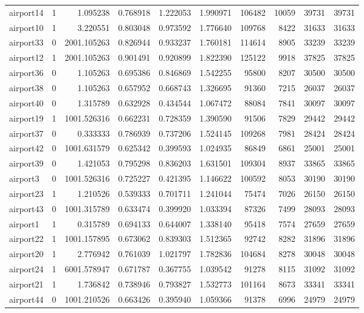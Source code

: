 \begin{longtable}{|l|r|r|r|r|r|r|r|r|r|}
airport14 & 1 & 1.095238 & 0.768918 & 1.222053 & 1.990971 & 106482 & 10059 & 39731 & 39731 \\
airport10 & 1 & 3.220551 & 0.803048 & 0.973592 & 1.776640 & 109768 & 8422 & 31633 & 31633 \\
airport33 & 0 & 2001.105263 & 0.826944 & 0.933237 & 1.760181 & 114614 & 8905 & 33239 & 33239 \\
airport12 & 1 & 2001.105263 & 0.901491 & 0.920899 & 1.822390 & 125122 & 9918 & 37825 & 37825 \\
airport36 & 0 & 1.105263 & 0.695386 & 0.846869 & 1.542255 & 95800 & 8207 & 30500 & 30500 \\
airport38 & 0 & 1.105263 & 0.657952 & 0.668743 & 1.326695 & 91360 & 7215 & 26037 & 26037 \\
airport40 & 0 & 1.315789 & 0.632928 & 0.434544 & 1.067472 & 88084 & 7841 & 30097 & 30097 \\
airport19 & 1 & 1001.526316 & 0.662231 & 0.728359 & 1.390590 & 91506 & 7829 & 29442 & 29442 \\
airport37 & 0 & 0.333333 & 0.786939 & 0.737206 & 1.524145 & 109268 & 7981 & 28424 & 28424 \\
airport42 & 0 & 1001.631579 & 0.625342 & 0.399593 & 1.024935 & 86849 & 6861 & 25001 & 25001 \\
airport39 & 0 & 1.421053 & 0.795298 & 0.836203 & 1.631501 & 109304 & 8937 & 33865 & 33865 \\
airport3 & 0 & 1001.526316 & 0.725227 & 0.421395 & 1.146622 & 100592 & 8053 & 30190 & 30190 \\
airport23 & 1 & 1.210526 & 0.539333 & 0.701711 & 1.241044 & 75474 & 7026 & 26150 & 26150 \\
airport43 & 0 & 1001.315789 & 0.633474 & 0.399920 & 1.033394 & 87326 & 7499 & 28093 & 28093 \\
airport1 & 1 & 0.315789 & 0.694133 & 0.644007 & 1.338140 & 95418 & 7574 & 27659 & 27659 \\
airport22 & 1 & 1001.157895 & 0.673062 & 0.839303 & 1.512365 & 92742 & 8282 & 31896 & 31896 \\
airport20 & 1 & 2.776942 & 0.761039 & 1.021797 & 1.782836 & 104684 & 8278 & 30048 & 30048 \\
airport24 & 1 & 6001.578947 & 0.671787 & 0.367755 & 1.039542 & 91278 & 8115 & 31092 & 31092 \\
airport21 & 1 & 1.736842 & 0.738946 & 0.793827 & 1.532773 & 101164 & 8673 & 33341 & 33341 \\
airport44 & 0 & 1001.210526 & 0.663426 & 0.395940 & 1.059366 & 91378 & 6996 & 24979 & 24979 \\

\end{longtable}
